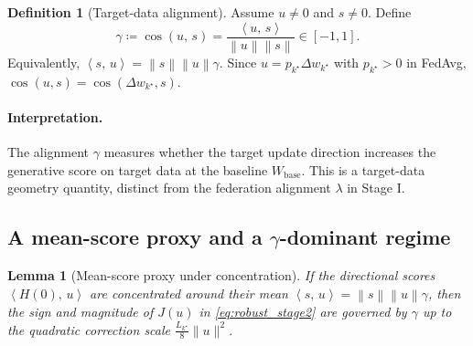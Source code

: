 \documentclass{article}
\theoremstyle{plain}
\newtheorem{lemma}{Lemma}
\theoremstyle{definition}
\newtheorem{definition}{Definition}
\theoremstyle{remark}
\numberwithin{theorem}{section}
\numberwithin{definition}{section}
\numberwithin{remark}{section}
\numberwithin{lemma}{section}
\numberwithin{assumption}{section}
\newcommand{\ip}[2]{\left\langle #1,\,#2 \right\rangle}
\newcommand{\norm}[1]{\left\lVert #1 \right\rVert}
\newcommand{\tindex}{k^\star}
\newcommand{\utarget}{u}
\begin{document}
\begin{definition}[Target-data alignment]
\label{def:gamma}
Assume $\utarget\neq 0$ and $s\neq 0$. Define
\begin{equation}
\label{eq:gamma}
\gamma \coloneqq \cos(\utarget,\,s)=\frac{\ip{\utarget}{s}}{\norm{\utarget}\norm{s}}\in[-1,1].
\end{equation}
Equivalently, $\ip{s}{\utarget}=\norm{s}\norm{\utarget}\gamma$.
Since $\utarget=p_{\tindex}\Delta w_{\tindex}$ with $p_{\tindex}>0$ in FedAvg, $\cos(\utarget,s)=\cos(\Delta w_{\tindex},s)$.
\end{definition}

\paragraph{Interpretation.}
The alignment $\gamma$ measures whether the target update direction increases the generative score on target data at the baseline $W_{\mathrm{base}}$.
This is a target-data geometry quantity, distinct from the federation alignment $\lambda$ in Stage I.

\subsection{A mean-score proxy and a \texorpdfstring{$\gamma$}{gamma}-dominant regime}

\begin{lemma}[Mean-score proxy under concentration]
\label{prop:mean_proxy}
If the directional scores $\ip{H(0)}{\utarget}$ are concentrated around their mean $\ip{s}{\utarget}=\norm{s}\norm{\utarget}\gamma$, then
the sign and magnitude of $J(\utarget)$ in \eqref{eq:robust_stage2} are governed by $\gamma$ up to the quadratic correction scale
$\frac{L_{\tindex}}{8}\|\utarget\|^2$.
\end{lemma}
\end{document}

